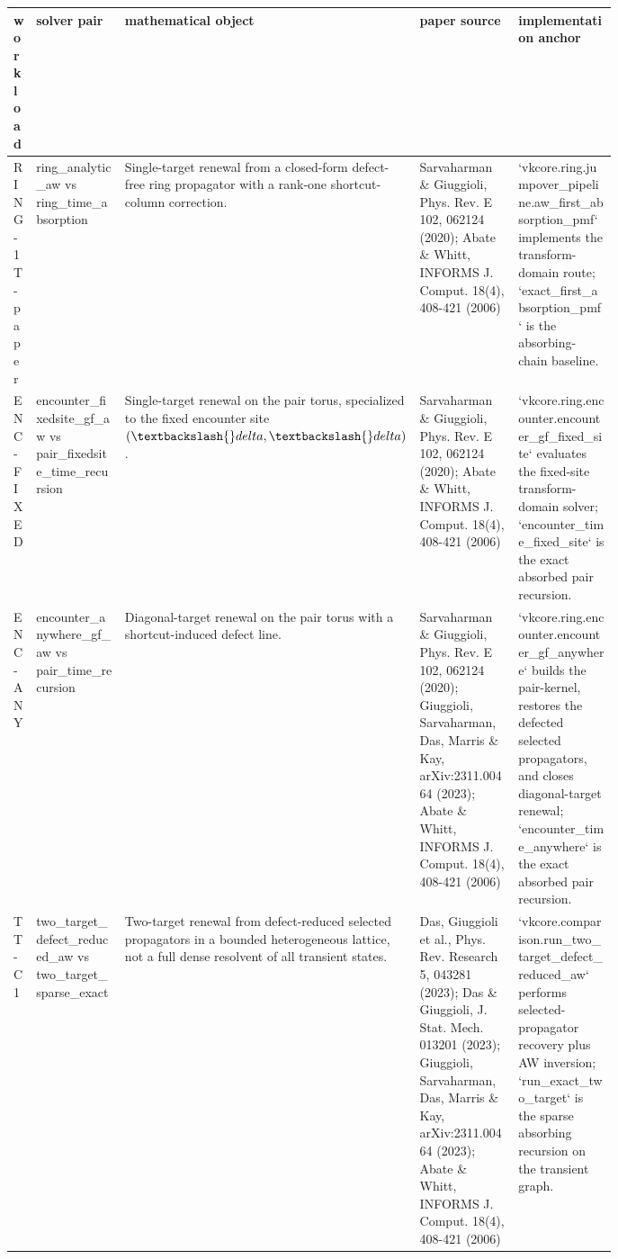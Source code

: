 \begin{tabular}{lp{0.18\linewidth}p{0.20\linewidth}p{0.20\linewidth}p{0.20\linewidth}}
\toprule
 workload & solver pair & mathematical object & paper source & implementation anchor \\
\midrule
RING-1T-paper & ring\_analytic\_aw vs ring\_time\_absorption & Single-target renewal from a closed-form defect-free ring propagator with a rank-one shortcut-column correction. & Sarvaharman \& Giuggioli, Phys. Rev. E 102, 062124 (2020); Abate \& Whitt, INFORMS J. Comput. 18(4), 408-421 (2006) & `vkcore.ring.jumpover\_pipeline.aw\_first\_absorption\_pmf` implements the transform-domain route; `exact\_first\_absorption\_pmf` is the absorbing-chain baseline. \\
ENC-FIXED & encounter\_fixedsite\_gf\_aw vs pair\_fixedsite\_time\_recursion & Single-target renewal on the pair torus, specialized to the fixed encounter site $(\textbackslash{}delta,\textbackslash{}delta)$. & Sarvaharman \& Giuggioli, Phys. Rev. E 102, 062124 (2020); Abate \& Whitt, INFORMS J. Comput. 18(4), 408-421 (2006) & `vkcore.ring.encounter.encounter\_gf\_fixed\_site` evaluates the fixed-site transform-domain solver; `encounter\_time\_fixed\_site` is the exact absorbed pair recursion. \\
ENC-ANY & encounter\_anywhere\_gf\_aw vs pair\_time\_recursion & Diagonal-target renewal on the pair torus with a shortcut-induced defect line. & Sarvaharman \& Giuggioli, Phys. Rev. E 102, 062124 (2020); Giuggioli, Sarvaharman, Das, Marris \& Kay, arXiv:2311.00464 (2023); Abate \& Whitt, INFORMS J. Comput. 18(4), 408-421 (2006) & `vkcore.ring.encounter.encounter\_gf\_anywhere` builds the pair-kernel, restores the defected selected propagators, and closes diagonal-target renewal; `encounter\_time\_anywhere` is the exact absorbed pair recursion. \\
TT-C1 & two\_target\_defect\_reduced\_aw vs two\_target\_sparse\_exact & Two-target renewal from defect-reduced selected propagators in a bounded heterogeneous lattice, not a full dense resolvent of all transient states. & Das, Giuggioli et al., Phys. Rev. Research 5, 043281 (2023); Das \& Giuggioli, J. Stat. Mech. 013201 (2023); Giuggioli, Sarvaharman, Das, Marris \& Kay, arXiv:2311.00464 (2023); Abate \& Whitt, INFORMS J. Comput. 18(4), 408-421 (2006) & `vkcore.comparison.run\_two\_target\_defect\_reduced\_aw` performs selected-propagator recovery plus AW inversion; `run\_exact\_two\_target` is the sparse absorbing recursion on the transient graph. \\

\end{tabular}
